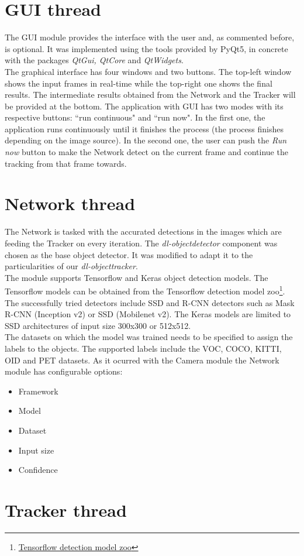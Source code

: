 \section{GUI thread}
The GUI module provides the interface with the user and, as commented before, is optional. It was implemented using the tools provided by PyQt5, in concrete with the packages \textit{QtGui, QtCore} and \textit{QtWidgets}.\\
The graphical interface has four windows and two buttons. The top-left window shows the input frames in real-time while the top-right one shows the final results. The intermediate results obtained from the Network and the Tracker will be provided at the bottom. The application with GUI has two modes with its respective buttons: ``run continuous" and ``run now". In the first one, the application runs continuously until it finishes the process (the process finishes depending on the image source). In the second one, the user can push the \textit{Run now} button to make the Network detect on the current frame and continue the tracking from that frame towards.
\section{Network thread} 
The Network is tasked with the accurated detections in the images which are feeding the Tracker on every iteration. The \textit{dl-objectdetector} component was chosen as the base object detector. It was modified to adapt it to the particularities of our \textit{dl-objecttracker}.\\
The module supports Tensorflow and Keras object detection models. The Tensorflow models can be obtained from the Tensorflow detection model zoo\footnote{\href {https://github.com/tensorflow/models/blob/master/research/object_detection/g3doc/detection_model_zoo.md}{Tensorflow detection model zoo}}. The successfully tried detectors include SSD and R-CNN detectors such as Mask R-CNN (Inception v2) or SSD (Mobilenet v2). The Keras models are limited to SSD architectures of input size 300x300 or 512x512.\\
The datasets on which the model was trained needs to be specified to assign the labels to the objects. The supported labels include the VOC, COCO, KITTI, OID and PET datasets. As it ocurred with the Camera module the Network module has configurable options:
\begin{itemize}
    \item Framework
    \item Model
    \item Dataset
    \item Input size
\item Confidence
\end{itemize}
\section{Tracker thread}
